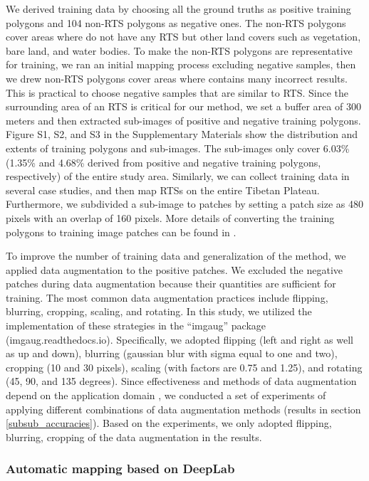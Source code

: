 \documentclass[preprint,12pt,authoryear]{elsarticle}
\begin{document}
We derived training data by choosing all the ground truths as positive training polygons and 104 non-RTS polygons as negative ones. The non-RTS polygons cover areas where do not have any RTS but other land covers such as vegetation, bare land, and water bodies. To make the non-RTS polygons are representative for training, we ran an initial mapping process excluding negative samples, then we drew non-RTS polygons cover areas where contains many incorrect results. This is practical to choose negative samples that are similar to RTS. Since the surrounding area of an RTS is critical for our method, we set a buffer area of 300 meters and then extracted sub-images of positive and negative training polygons. Figure S1, S2, and S3 in the Supplementary Materials show the distribution and extents of training polygons and sub-images. The sub-images only cover 6.03\% (1.35\% and 4.68\% derived from positive and negative training polygons, respectively) of the entire study area. Similarly, we can collect training data in several case studies, and then map RTSs on the entire Tibetan Plateau. Furthermore, we subdivided a sub-image to patches by setting a patch size as 480 pixels with an overlap of 160 pixels. More details of converting the training polygons to training image patches can be found in \cite{huang2018automatic}. 

To improve the number of training data and generalization of the method, we applied data augmentation to the positive patches. We excluded the negative patches during data augmentation because their quantities are sufficient for training. The most common data augmentation practices include flipping, blurring, cropping, scaling, and rotating. In this study, we utilized the implementation of these strategies in the “imgaug” package (imgaug.readthedocs.io). Specifically, we adopted flipping (left and right as well as up and down), blurring (gaussian blur with sigma equal to one and two), cropping (10 and 30 pixels), scaling (with factors are 0.75 and 1.25), and rotating (45, 90, and 135 degrees). Since effectiveness and methods of data augmentation depend on the application domain \citep{perez2017effectiveness}, we conducted a set of experiments of applying different combinations of data augmentation methods (results in section \ref{subsub_accuracies}). Based on the experiments, we only adopted flipping, blurring, cropping of the data augmentation in the results. 

\subsubsection{Automatic mapping based on DeepLab}
\label{subsubsec_deeplab}
\end{document}
